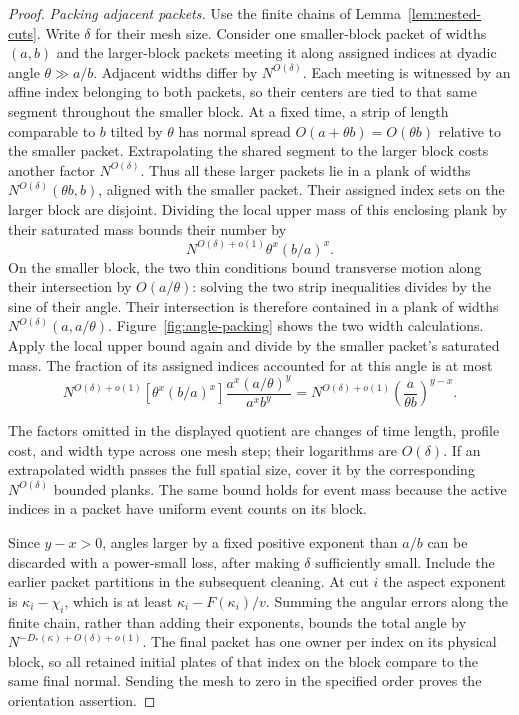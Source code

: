 \begin{proof}
\emph{Packing adjacent packets.}
Use the finite chains of Lemma~\ref{lem:nested-cuts}. Write $\delta$ for
their mesh size. Consider one smaller-block packet of widths $(a,b)$ and
the larger-block packets meeting it along assigned indices at dyadic
angle $\theta\gg a/b$. Adjacent widths differ by $N^{O(\delta)}$.
Each meeting is witnessed by an affine index belonging to both packets,
so their centers are tied to that same segment throughout the smaller
block. At a fixed time, a strip of length comparable to $b$ tilted by
$\theta$ has normal spread $O(a+\theta b)=O(\theta b)$ relative to
the smaller packet. Extrapolating the shared segment to the larger
block costs another factor $N^{O(\delta)}$. Thus all these larger
packets lie in a plank of widths
$N^{O(\delta)}(\theta b,b)$, aligned with the smaller packet. Their
assigned index sets on the larger block are disjoint. Dividing the local
upper mass of this enclosing plank by their saturated mass bounds their
number by
\[
 N^{O(\delta)+o(1)}\theta^x(b/a)^x.
\]
On the smaller block, the two thin conditions bound transverse motion
along their intersection by $O(a/\theta)$: solving the two strip
inequalities divides by the sine of their angle. Their intersection
is therefore contained in a plank of widths
$N^{O(\delta)}(a,a/\theta)$. Figure~\ref{fig:angle-packing} shows
the two width calculations. Apply the local upper bound again and divide
by the smaller packet's saturated mass. The fraction of its assigned
indices accounted for at this angle is at most
\begin{equation}
 N^{O(\delta)+o(1)}
 \left[\theta^x(b/a)^x\right]
 \frac{a^x(a/\theta)^y}{a^xb^y}
 =N^{O(\delta)+o(1)}
       \left(\frac{a}{\theta b}\right)^{y-x}.
\label{eq:adjacent-angle-packing}
\end{equation}



The factors omitted in the displayed quotient are changes of time
length, profile cost, and width type across one mesh step; their
logarithms are $O(\delta)$. If an extrapolated width passes the full
spatial size, cover it by the corresponding $N^{O(\delta)}$ bounded
planks. The same bound holds for event mass because the active indices
in a packet have uniform event counts on its block.

Since $y-x>0$, angles larger by a fixed positive exponent than $a/b$ can
be discarded with a power-small loss, after making $\delta$ sufficiently
small. Include the earlier packet partitions in the subsequent cleaning.
At cut $i$ the aspect exponent is $\kappa_i-\chi_i$, which is at least
$\kappa_i-F(\kappa_i)/v$. Summing the angular errors along the finite
chain, rather than adding their exponents, bounds the total angle by
$N^{-D_*(\kappa)+O(\delta)+o(1)}$. The final packet has one owner per
index on its physical block, so all retained initial plates of that
index on the block compare to the same final normal. Sending the mesh
to zero in the specified order proves the orientation assertion.


\end{proof}

